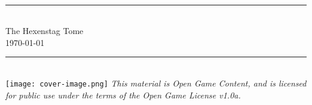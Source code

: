 \documentclass[12pt,twoside,onecolumn,openany,final]{memoir}
\begin{document}

\thispagestyle{empty}
\begin{center}
\textsc{\Large}\\[0.25cm]
\rule{\linewidth}{0.5mm} \\[0.6cm]
\fontsize{30}{30} \selectfont The Hexenstag Tome\\[.30cm]
\fontsize{16}{18} \selectfont \normalsize{\today}\\
\rule{\linewidth}{0.5mm} \\[0.6cm]
\texttt{[image: cover-image.png]} %
\vfill
\footnotesize{\textit{This material is Open Game Content, and is licensed for public use under the terms of the Open Game License v1.0a.}}\\
\end{center}

\pagebreak

\sffamily
\pagestyle{plain}
\raggedbottom

\renewcommand{\contentsname}{Table of Contents}
\setcounter{tocdepth}{2}
\small{\tableofcontents}


\clearpage
















%


\end{document}
